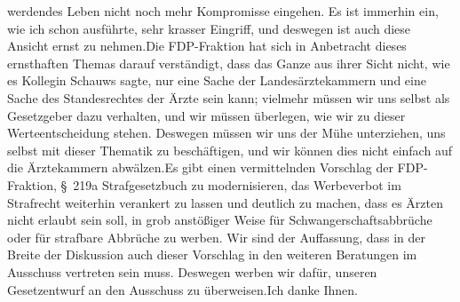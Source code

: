\documentclass{article}
\begin{document}
werdendes Leben nicht noch mehr Kompromisse eingehen. Es ist immerhin ein, wie ich schon ausführte, sehr krasser Eingriff, und deswegen ist auch diese Ansicht ernst zu nehmen.Die FDP-Fraktion hat sich in Anbetracht dieses ernsthaften Themas darauf verständigt, dass das Ganze aus ihrer Sicht nicht, wie es Kollegin Schauws sagte, nur eine Sache der Landesärztekammern und eine Sache des Standesrechtes der Ärzte sein kann; vielmehr müssen wir uns selbst als Gesetzgeber dazu verhalten, und wir müssen überlegen, wie wir zu dieser Werteentscheidung stehen. Deswegen müssen wir uns der Mühe unterziehen, uns selbst mit dieser Thematik zu beschäftigen, und wir können dies nicht einfach auf die Ärztekammern abwälzen.Es gibt einen vermittelnden Vorschlag der FDP-Fraktion, § 219a Strafgesetzbuch zu modernisieren, das Werbeverbot im Strafrecht weiterhin verankert zu lassen und deutlich zu machen, dass es Ärzten nicht erlaubt sein soll, in grob anstößiger Weise für Schwangerschaftsabbrüche oder für strafbare Abbrüche zu werben. Wir sind der Auffassung, dass in der Breite der Diskussion auch dieser Vorschlag in den weiteren Beratungen im Ausschuss vertreten sein muss. Deswegen werben wir dafür, unseren Gesetzentwurf an den Ausschuss zu überweisen.Ich danke Ihnen.
\end{document}
